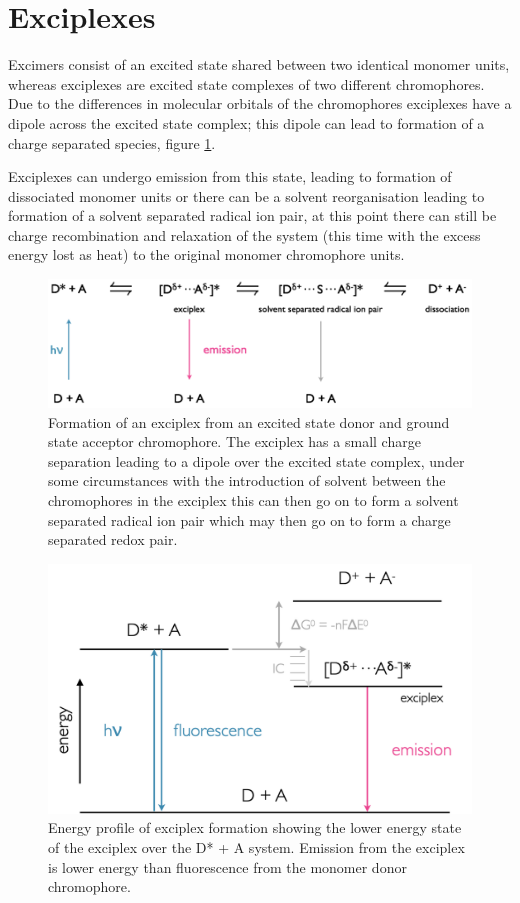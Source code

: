 \documentclass[
]{book}
\begin{document}
\hypertarget{exciplexes}{%
\section{Exciplexes}\label{exciplexes}}

Excimers consist of an excited state shared between two identical monomer units, whereas exciplexes are excited state complexes of two different chromophores. Due to the differences in molecular orbitals of the chromophores exciplexes have a dipole across the excited state complex; this dipole can lead to formation of a charge separated species, figure \ref{fig:exciplex}.

Exciplexes can undergo emission from this state, leading to formation of dissociated monomer units or there can be a solvent reorganisation leading to formation of a solvent separated radical ion pair, at this point there can still be charge recombination and relaxation of the system (this time with the excess energy lost as heat) to the original monomer chromophore units.

\begin{figure}

{\centering \includegraphics[width=0.7\linewidth]{images/exciplex} 

}

\caption{Formation of an exciplex from an excited state donor and ground state acceptor chromophore. The exciplex has a small charge separation leading to a dipole over the excited state complex, under some circumstances with the introduction of solvent between the chromophores in the exciplex this can then go on to form a solvent separated radical ion pair which may then go on to form a charge separated redox pair.}\label{fig:exciplex}
\end{figure}

\begin{figure}

{\centering \includegraphics[width=0.7\linewidth]{images/exciplexenergy} 

}

\caption{Energy profile of exciplex formation showing the lower energy state of the exciplex over the D* + A system. Emission from the exciplex is lower energy than fluorescence from the monomer donor chromophore.}\label{fig:exciplexenergy}
\end{figure}
\end{document}
